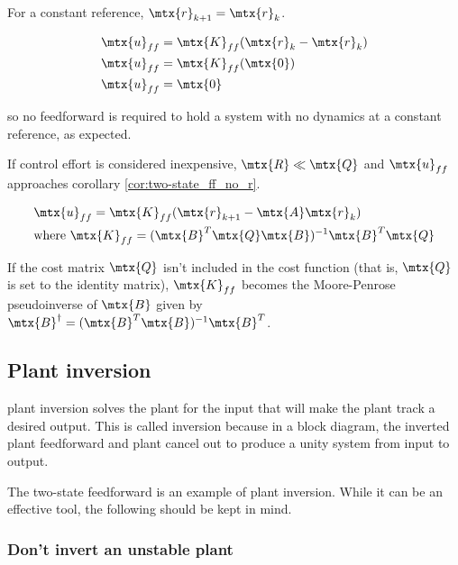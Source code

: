 For a constant \gls{reference}, $\mtx{r}_{k+1} = \mtx{r}_k$.

\begin{align*}
  \mtx{u}_{ff} &= \mtx{K}_{ff} (\mtx{r}_k - \mtx{r}_k) \\
  \mtx{u}_{ff} &= \mtx{K}_{ff} (\mtx{0}) \\
  \mtx{u}_{ff} &= \mtx{0}
\end{align*}

so no feedforward is required to hold a \gls{system} with no dynamics at a
constant \gls{reference}, as expected.

If \gls{control effort} is considered inexpensive, $\mtx{R} \ll \mtx{Q}$ and
$\mtx{u}_{ff}$ approaches corollary \ref{cor:two-state_ff_no_r}.

\begin{corollary}
  \label{cor:two-state_ff_no_r}

  \begin{align}
    &\mtx{u}_{ff} = \mtx{K}_{ff} (\mtx{r}_{k+1} - \mtx{A}\mtx{r}_k) \\
    &\text{where } \mtx{K}_{ff} =
      (\mtx{B}^T\mtx{Q}\mtx{B})^{-1}\mtx{B}^T\mtx{Q}
  \end{align}
\end{corollary}

\begin{remark}
  If the cost matrix $\mtx{Q}$ isn't included in the cost function (that is,
  $\mtx{Q}$ is set to the identity matrix), $\mtx{K}_{ff}$ becomes the
  Moore-Penrose pseudoinverse of $\mtx{B}$ given by
  $\mtx{B}^\dagger = (\mtx{B}^T\mtx{B})^{-1}\mtx{B}^T$.
\end{remark}

\subsection{Plant inversion}

\Gls{plant} inversion solves the \gls{plant} for the input that will make the
\gls{plant} track a desired output. This is called inversion because in a block
diagram, the inverted \gls{plant} feedforward and \gls{plant} cancel out to
produce a unity system from input to output.

The two-state feedforward is an example of \gls{plant} inversion. While it can
be an effective tool, the following should be kept in mind.

\subsubsection{Don't invert an unstable plant}

